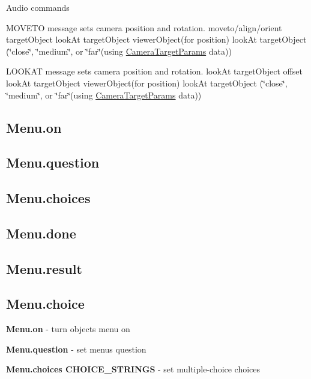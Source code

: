 Audio commands

M\+O\+V\+E\+TO message sets camera position and rotation. moveto/align/orient target\+Object look\+At target\+Object viewer\+Object(for position) look\+At target\+Object (\char`\"{}close\char`\"{}, \char`\"{}medium\char`\"{}, or \char`\"{}far\char`\"{}(using \hyperlink{class_camera_target_params}{Camera\+Target\+Params} data)) 

L\+O\+O\+K\+AT message sets camera position and rotation. look\+At target\+Object offset look\+At target\+Object viewer\+Object(for position) look\+At target\+Object (\char`\"{}close\char`\"{}, \char`\"{}medium\char`\"{}, or \char`\"{}far\char`\"{}(using \hyperlink{class_camera_target_params}{Camera\+Target\+Params} data)) 





\subsection*{Menu.\+on }

\subsection*{Menu.\+question }

\subsection*{Menu.\+choices }

\subsection*{Menu.\+done }

\subsection*{Menu.\+result }

\subsection*{Menu.\+choice }

{\bfseries  Menu.\+on } -\/ turn object\textquotesingle{}s menu on

{\bfseries  Menu.\+question} -\/ set menu\textquotesingle{}s question

{\bfseries  Menu.\+choices C\+H\+O\+I\+C\+E\+\_\+\+S\+T\+R\+I\+N\+GS} -\/ set multiple-\/choice choices

